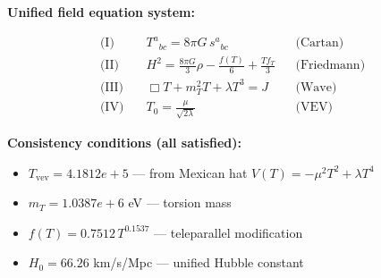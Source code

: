 
\textbf{Unified field equation system:}

\begin{align}
  \text{(I)} \quad & T^a{}_{bc} = 8\pi G \, s^a{}_{bc} && \text{(Cartan)} \\
  \text{(II)} \quad & H^2 = \frac{8\pi G}{3}\rho - \frac{f(T)}{6} + \frac{Tf_T}{3} && \text{(Friedmann)} \\
  \text{(III)} \quad & \Box T + m_T^2 T + \lambda T^3 = J && \text{(Wave)} \\
  \text{(IV)} \quad & T_0 = \frac{\mu}{\sqrt{2\lambda}} && \text{(VEV)}
\end{align}

\textbf{Consistency conditions (all satisfied):}
\begin{itemize}
  \item $T_{\text{vev}} = 4.1812e+5$ — from Mexican hat $V(T) = -\mu^2 T^2 + \lambda T^4$
  \item $m_T = 1.0387e+6$ eV — torsion mass
  \item $f(T) = 0.7512 \, T^{0.1537}$ — teleparallel modification
  \item $H_0 = 66.26$ km/s/Mpc — unified Hubble constant
\end{itemize}